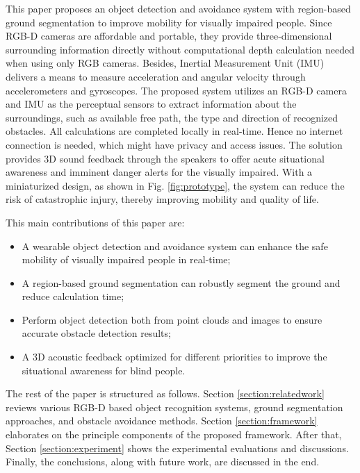 \documentclass{ieeeaccess}
\begin{document}
This paper proposes an object detection and avoidance system with region-based ground segmentation to improve mobility for visually impaired people.  Since RGB-D cameras are affordable and portable, they provide three-dimensional surrounding information directly without computational depth calculation needed when using only RGB cameras. Besides, Inertial Measurement Unit (IMU) delivers a means to measure acceleration and angular velocity through accelerometers and gyroscopes. The proposed system utilizes an RGB-D camera and IMU as the perceptual sensors to extract information about the surroundings, such as available free path, the type and direction of recognized obstacles. All calculations are completed locally in real-time. Hence no internet connection is needed, which might have privacy and access issues. The solution provides 3D sound feedback through the speakers to offer acute situational awareness and imminent danger alerts for the visually impaired. With a miniaturized design, as shown in Fig. \ref{fig:prototype}, the system can reduce the risk of catastrophic injury, thereby improving mobility and quality of life.

This main contributions of this paper are:
\begin{itemize}
    \item A wearable object detection and avoidance system can enhance the safe mobility of visually impaired people in real-time;
    
    \item A region-based ground segmentation can robustly segment the ground and reduce calculation time;
    
    \item Perform object detection both from point clouds and images to ensure accurate obstacle detection results;
    
    \item A 3D acoustic feedback optimized for different priorities to improve the situational awareness for blind people.

\end{itemize}




The rest of the paper is structured as follows. Section \ref{section:relatedwork} reviews various RGB-D based object recognition systems, ground segmentation approaches, and obstacle avoidance methods. Section \ref{section:framework} elaborates on the principle components of the proposed framework. After that, Section \ref{section:experiment} shows the experimental evaluations and discussions. Finally, the conclusions, along with future work, are discussed in the end.
\end{document}
